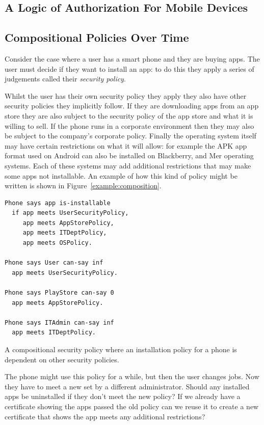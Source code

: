 \documentclass[a4paper,12pt,sfsidenotes]{tufte-book}
\begin{document}
\subsection{A Logic of Authorization For Mobile Devices}


\subsection{Compositional Policies Over Time}

Consider the case where a user has a smart phone and they are buying apps.  The
user must decide if they want to install an app: to do this they apply a series
of judgements called their \emph{security policy}.  

Whilst the user has their own security policy they apply they also have other
security policies they implicitly follow.  If they are downloading apps from an
app store they are also subject to the security policy of the app store and what
it is willing to sell.  If the phone runs in a corporate environment then they
may also be subject to the company's corporate policy.  Finally the operating
system itself may have certain restrictions on what it will allow: for example
the APK app format used on Android can also be installed on Blackberry, and Mer
operating systems.  Each of these systems may add additional restrictions that
may make some apps not installable.  An example of how this kind of policy might
be written is shown in Figure~\ref{example:composition}.

\begin{marginfigure}\label{example:composition}
  \begin{lstlisting}[language=SecPAL]
Phone says app is-installable
  if app meets UserSecurityPolicy,
     app meets AppStorePolicy,
     app meets ITDeptPolicy,
     app meets OSPolicy.

Phone says User can-say inf
  app meets UserSecurityPolicy.

Phone says PlayStore can-say 0
  app meets AppStorePolicy.

Phone says ITAdmin can-say inf
  app meets ITDeptPolicy.
  \end{lstlisting}
  \caption{A compositional security policy where an installation policy for a
    phone is dependent on other security policies.}
\end{marginfigure}
     
The phone might use this policy for a while, but then the user changes jobs.
Now they have to meet a new  set by a different administrator.
Should any installed apps be uninstalled if they don't meet the new policy?  If
we already have a certificate showing the apps passed the old policy can we
reuse it to create a new certificate that shows the app meets any additional
restrictions?
\end{document}
